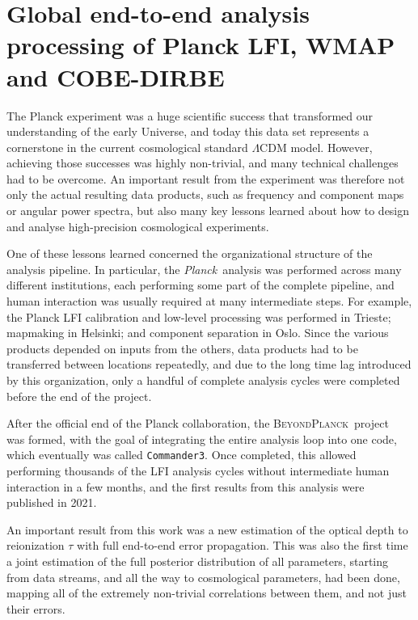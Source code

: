 \documentclass{moriond}
\def\commanderthree{\texttt{Commander3}}
\def\Planck{\textit{Planck}}
\DeclareRobustCommand{\BeyondPlanck}{{\fontseries{m}\selectfont\textsc{BeyondPlanck}}}
\begin{document}
\section{Global end-to-end analysis processing of Planck LFI, WMAP and COBE-DIRBE}
The Planck experiment was a huge scientific success that transformed our understanding of the early Universe, and today this data set represents a cornerstone in the current cosmological standard $\Lambda$CDM model. However, achieving those successes was highly non-trivial, and many technical challenges had to be overcome. An important result from the experiment was therefore not only the actual resulting data products, such as frequency and component maps or angular power spectra, but also many key lessons learned about how to design and analyse high-precision cosmological experiments. 

One of these lessons learned concerned the organizational structure of the analysis pipeline. In particular, the \Planck\ analysis was performed across many different institutions, each performing some part of the complete pipeline, and human interaction was usually required at many intermediate steps. For example, the Planck LFI calibration and low-level processing was performed in Trieste; mapmaking in Helsinki; and component separation in Oslo. Since the various products depended on inputs from the others, data products had to be transferred between locations repeatedly, and due to the long time lag introduced by this organization, only a handful of complete analysis cycles were completed before the end of the project.

After the official end of the Planck collaboration, the \BeyondPlanck\ project~\cite{bp01} was formed, with the goal of integrating the entire analysis loop into one code, which eventually was called \commanderthree. Once completed, this allowed performing thousands of the LFI analysis cycles without intermediate human interaction in a few months, and the first results from this analysis were published in 2021.

An important result from this work was a new estimation of the optical depth to reionization $\tau$ with full end-to-end  error propagation. 
This was also the first time a joint estimation of the full posterior distribution of all parameters, starting from data streams, and all the way to cosmological parameters, had been done, mapping all of the extremely non-trivial correlations between them, and not just their errors. 
\end{document}
